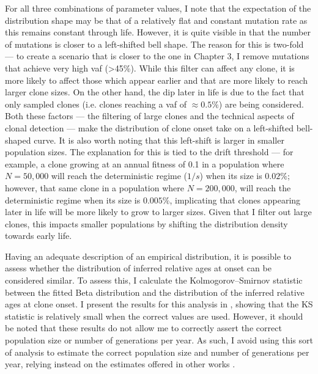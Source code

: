 For all three combinations of parameter values, I note that the expectation of the distribution shape may be that of a relatively flat and constant mutation rate as this remains constant through life. However, it is quite visible in  that the number of mutations is closer to a left-shifted bell shape. The reason for this is two-fold --- to create a scenario that is closer to the one in Chapter 3, I remove mutations that achieve very high \ac{vaf} (>45\%). While this filter can affect any clone, it is more likely to affect those which appear earlier and that are more likely to reach larger clone sizes. On the other hand, the dip later in life is due to the fact that only sampled clones (i.e. clones reaching a \ac{vaf} of $\approx 0.5\%$) are being considered. Both these factors --- the filtering of large clones and the technical aspects of clonal detection --- make the distribution of clone onset take on a left-shifted bell-shaped curve. It is also worth noting that this left-shift is larger in smaller population sizes. The explanation for this is tied to the drift threshold --- for example, a clone growing at an annual fitness of 0.1 in a population where $N=50,000$ will reach the deterministic regime ($1/s$) when its size is $0.02\%$; however, that same clone in a population where $N=200,000$, will reach the deterministic regime when its size is $0.005\%$, implicating that clones appearing later in life will be more likely to grow to larger sizes. Given that I filter out large clones, this impacts smaller populations by shifting the distribution density towards early life. 

Having an adequate description of an empirical distribution, it is possible to assess whether the distribution of inferred relative ages at onset can be considered similar. To assess this, I calculate the Kolmogorov–Smirnov statistic between the fitted Beta distribution and the distribution of the inferred relative ages at clone onset. I present the results for this analysis in , showing that the KS statistic is relatively small when the correct values are used. However, it should be noted that these results do not allow me to correctly assert the correct population size or number of generations per year. As such, I avoid using this sort of analysis to estimate the correct population size and number of generations per year, relying instead on the estimates offered in other works \cite{Lee-Six2018-lp,Mitchell2021-zl}.

\begin{figure}[!ht]
	\label{fig:heatmap-ks-d}
\end{figure}


